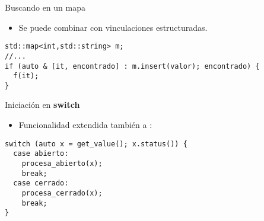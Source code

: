 \begin{frame}[t,fragile]{Buscando en un mapa}
\begin{itemize}
  \item Se puede combinar con vinculaciones estructuradas.
\end{itemize}
\begin{lstlisting}
std::map<int,std::string> m;
//...
if (auto & [it, encontrado] : m.insert(valor); encontrado) {
  f(it);
}
\end{lstlisting}
\end{frame}

\begin{frame}[t,fragile]{Iniciación en \textbf{switch}}
\begin{itemize}
  \item Funcionalidad extendida también a :
\end{itemize}
\begin{lstlisting}
switch (auto x = get_value(); x.status()) {
  case abierto:
    procesa_abierto(x);
    break;
  case cerrado:
    procesa_cerrado(x);
    break;
}
\end{lstlisting}
\end{frame}

